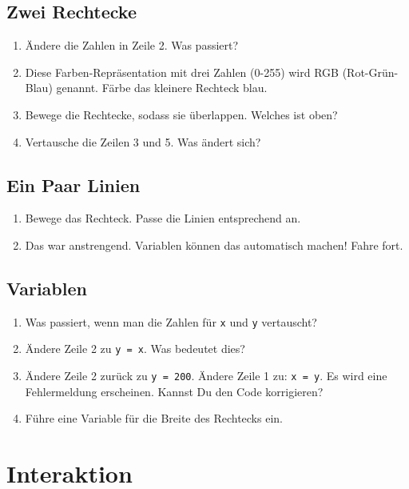 \documentclass[a4paper, 11pt]{article}
\begin{document}
\subsection{Zwei Rechtecke}



\begin{enumerate} 
\item Ändere die Zahlen in Zeile 2. Was passiert?
\item Diese Farben-Repräsentation mit drei Zahlen (0-255) wird RGB (Rot-Grün-Blau) genannt. Färbe das kleinere Rechteck blau.
\item Bewege die Rechtecke, sodass sie überlappen. Welches ist oben?
\item Vertausche die Zeilen 3 und 5. Was ändert sich?
\end{enumerate}

\subsection{Ein Paar Linien}



\begin{enumerate} 
\item Bewege das Rechteck. Passe die Linien entsprechend an.
\item Das war anstrengend. Variablen können das automatisch machen! Fahre fort.
\end{enumerate}

\subsection{Variablen}



\begin{enumerate} 
\item Was passiert, wenn man die Zahlen für \texttt{x} und \texttt{y} vertauscht?
\item Ändere Zeile 2 zu \texttt{y = x}. Was bedeutet dies?
\item Ändere Zeile 2 zurück zu \texttt{y = 200}. Ändere Zeile 1 zu: \texttt{x = y}. Es wird eine Fehlermeldung erscheinen. Kannst Du den Code korrigieren?
\item Führe eine Variable für die Breite des Rechtecks ein.
\end{enumerate}

\section{Interaktion}
\end{document}
